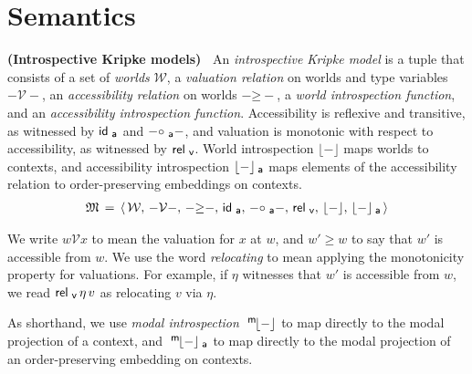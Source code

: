 \documentclass{entcs}
\numberwithin{equation}{thm}
\newcommand{\binop}[1]{-\mathord{#1}-}
\newcommand{\tsf}[1]{\textsf{\upshape{#1}}}
\newcommand{\stsf}[1]{\tsf{\small{#1}}}
\renewcommand{\:}{\mathrel{:}}
\newcommand{\0}{\varnothing}
\newcommand{\M}{\mathfrak{M}}
\newcommand{\W}{\mathcal{W}}
\newcommand{\V}{\mathrel{\mathcal{V}}}
\newcommand{\ida}{\operatorname{\tsf{id}_{\stsf{a}}}}
\newcommand{\compa}{\mathrel{\circ_{\stsf{a}}}}
\newcommand{\relv}{\operatorname{\tsf{rel}_{\stsf{v}}}}
\newcommand{\peek}[1]{\mathopen{\lfloor}{#1}\mathclose{\rfloor}}
\newcommand{\peeka}[1]{\mathopen{\lfloor}{#1}\mathclose{\rfloor_{\mkern-2mu\stsf{a}}}}
\newcommand{\mpeek}[1]{\mathopen{^{\stsf{m}\mkern-3mu}\lfloor}{#1}\mathclose{\rfloor}}
\newcommand{\mpeeka}[1]{\mathopen{^{\stsf{m}\mkern-3mu}\lfloor}{#1}\mathclose{\rfloor_{\mkern-2mu\stsf{a}}}}
\begin{document}
\lipsum[1-5]


\section{Semantics}

\begin{definition}
  \textbf{(Introspective Kripke models)\ }
  An \emph{introspective Kripke model} is a tuple that consists of a set of \emph{worlds} $\W$, a \emph{valuation relation} on worlds and type variables $\binop{\V}$, an \emph{accessibility relation} on worlds $\binop{\ge}$, a \emph{world introspection function}, and an \emph{accessibility introspection function}.
  Accessibility is reflexive and transitive, as witnessed by $\ida$ and $\binop{\compa}$, and valuation is monotonic with respect to accessibility, as witnessed by $\relv$.
  World introspection $\peek{-}$ maps worlds to contexts, and accessibility introspection $\peeka{-}$ maps elements of the accessibility relation to order-preserving embeddings on contexts.
  \begin{gather*}
    \M \,=\, \langle\, \W,\, \binop{\V},\, \binop{\ge},\, \ida,\, \binop{\compa},\, \relv,\, \peek{-},\, \peeka{-}\, \rangle
  \end{gather*}
\end{definition}

\noindent
We write $w \V x$ to mean the valuation for $x$ at $w$, and $w' \ge w$ to say that $w'$ is accessible from $w$.
We use the word \emph{relocating} to mean applying the monotonicity property for valuations.
For example, if $\eta$ witnesses that $w'$ is accessible from $w$, we read $\relv \eta\, v$ as relocating $v$ via $\eta$.

As shorthand, we use \emph{modal introspection} $\mpeek{-}$ to map directly to the modal projection of a context, and $\mpeeka{-}$ to map directly to the modal projection of an order-preserving embedding on contexts.
\end{document}
